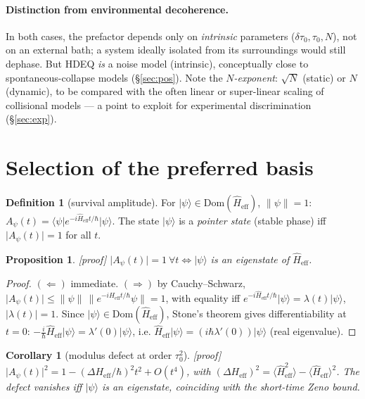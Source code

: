 \documentclass[11pt,a4paper]{article}
\newcommand{\ket}[1]{\lvert #1\rangle}
\newcommand{\bra}[1]{\langle #1\rvert}
\newcommand{\Heff}{\hat{H}_{\mathrm{eff}}}
\newcommand{\statut}[1]{{\footnotesize\textsf{[#1]}}}
\theoremstyle{plain}
\newtheorem{proposition}{Proposition}
\newtheorem{corollary}{Corollary}
\theoremstyle{definition}
\newtheorem{definition}{Definition}
\theoremstyle{remark}
\begin{document}
\paragraph{Distinction from environmental decoherence.} In both cases, the
prefactor depends only on \emph{intrinsic} parameters ($\delta\tau_0,\tau_0,N$),
not on an external bath; a system ideally isolated from its surroundings would
still dephase. But HDEQ \emph{is} a noise model (intrinsic), conceptually close
to spontaneous-collapse models (\S\ref{sec:pos}). Note the \emph{$N$-exponent}:
$\sqrt N$ (static) or $N$ (dynamic), to be compared with the often linear or
super-linear scaling of collisional models --- a point to exploit for
experimental discrimination (\S\ref{sec:exp}).

\section{Selection of the preferred basis}\label{sec:base}

\begin{definition}[survival amplitude]
For $\ket{\psi}\in\mathrm{Dom}(\Heff)$, $\lVert\psi\rVert=1$:
$A_\psi(t)=\bra{\psi}e^{-i\Heff t/\hbar}\ket{\psi}$. The state $\ket{\psi}$ is a
\emph{pointer state} (stable phase) iff $\lvert A_\psi(t)\rvert=1$ for all $t$.
\end{definition}

\begin{proposition}\label{prop:base}\statut{proof}
$\lvert A_\psi(t)\rvert=1\ \forall t\iff\ket{\psi}$ is an eigenstate of $\Heff$.
\end{proposition}
\begin{proof}
$(\Leftarrow)$ immediate. $(\Rightarrow)$ by Cauchy--Schwarz,
$\lvert A_\psi(t)\rvert\le\lVert\psi\rVert\,\lVert e^{-i\Heff t/\hbar}\psi\rVert=1$,
with equality iff $e^{-i\Heff t/\hbar}\ket{\psi}=\lambda(t)\ket{\psi}$,
$\lvert\lambda(t)\rvert=1$. Since $\ket{\psi}\in\mathrm{Dom}(\Heff)$, Stone's
theorem gives differentiability at $t=0$:
$-\tfrac{i}{\hbar}\Heff\ket{\psi}=\lambda'(0)\ket{\psi}$, i.e.
$\Heff\ket{\psi}=(i\hbar\lambda'(0))\ket{\psi}$ (real eigenvalue).
\end{proof}

\begin{corollary}[modulus defect at order $\tau_0^2$]\statut{proof}
$\lvert A_\psi(t)\rvert^2=1-(\Delta H_{\mathrm{eff}}/\hbar)^2 t^2+O(t^4)$, with
$(\Delta H_{\mathrm{eff}})^2=\langle\Heff^2\rangle-\langle\Heff\rangle^2$. The
defect vanishes iff $\ket{\psi}$ is an eigenstate, coinciding with the
short-time Zeno bound.
\end{corollary}
\end{document}
